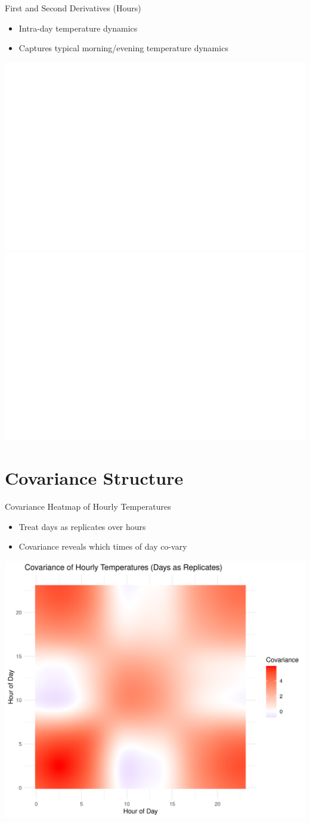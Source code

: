 \documentclass[svgnames, 12pt]{beamer}
\begin{document}
\begin{frame}{First and Second Derivatives (Hours)}
	\begin{itemize}
		\item Intra-day temperature dynamics
		\item Captures typical morning/evening temperature dynamics
	\end{itemize}
	\begin{center}
		\includegraphics[width=0.45\linewidth]{../notebooks/assets/derivative_hour1.png}
		\hfill
		\includegraphics[width=0.45\linewidth]{../notebooks/assets/derivative_hour2.png}
	\end{center}
\end{frame}

\section{Covariance Structure}

\begin{frame}{Covariance Heatmap of Hourly Temperatures}
	\begin{itemize}
		\item Treat days as replicates over hours
		\item Covariance reveals which times of day co-vary
	\end{itemize}
	\begin{center}
		\includegraphics[width=0.68\linewidth]{../notebooks/assets/covariance_heatmap.png}
	\end{center}
\end{frame}
\end{document}

